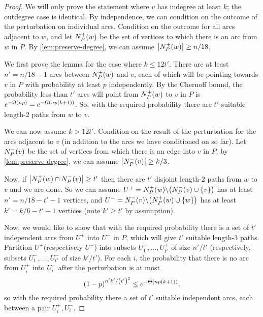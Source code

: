 \documentclass[11pt,english]{article}
\theoremstyle{plain}
\theoremstyle{definition}
\theoremstyle{definition}
\theoremstyle{plain}
\theoremstyle{plain}
\theoremstyle{plain}
\theoremstyle{plain}
\theoremstyle{remark}
\theoremstyle{remark}
\let\originalleft\left
\let\originalright\right
\renewcommand{\left}{\mathopen{}\mathclose\bgroup\originalleft}
\renewcommand{\right}{\aftergroup\egroup\originalright}
\begin{document}
\begin{proof}
We will only prove the statement where $v$ has indegree at least
$k$; the outdegree case is identical. By independence, we can condition
on the outcome of the perturbation on individual arcs. Condition on
the outcome for all arcs adjacent to $w$, and let $N_{P}^{+}\left(w\right)$
be the set of vertices to which there is an arc from $w$ in $P$.
By \ref{lem:preserve-degree}, we can assume $\left|N_{P}^{+}\left(w\right)\right|\ge n/18$.

We first prove the lemma for the case where $k\le12t'$. There are
at least $n'=n/18-1$ arcs between $N_{P}^{+}\left(w\right)$ and
$v$, each of which will be pointing towards $v$ in $P$ with
probability at least $p$ independently. By the Chernoff bound, the probability less
than $t'$ arcs will point from $N_{P}^{+}\left(w\right)$ to $v$
in $P$ is $e^{-\Omega\left(np\right)}=e^{-\Omega\left(np\left(k+1\right)\right)}$.
So, with the required probability there are $t'$ suitable length-2
paths from $w$ to $v$.

We can now assume $k>12t'$. Condition on the result of the perturbation
for the arcs adjacent to $v$ (in addition to the arcs we have conditioned
on so far). Let $N_{P}^{-}\left(v\right)$ be the set of vertices
from which there is an edge into $v$ in $P$; by \ref{lem:preserve-degree},
we can assume $\left|N_{P}^{-}\left(v\right)\right|\ge k/3$.

Now, if $\left|N_{P}^{+}\left(w\right)\cap N_{P}^{-}\left(v\right)\right|\ge t'$
then there are $t'$ disjoint length-2 paths from $w$ to $v$ and
we are done. So we can assume $U^{+}=N_{P}^{+}\left(w\right)\backslash\left(N_{P}^{-}\left(v\right)\cup\left\{ v\right\} \right)$
has at least $n'=n/18-t'-1$ vertices, and $U^{-}=N_{P}^{-}\left(v\right)\backslash\left(N_{P}^{+}\left(w\right)\cup\left\{ w\right\} \right)$
has at least $k'=k/6-t'-1$ vertices (note $k'\ge t'$ by assumption).

Now, we would like to show that with the required probability there
is a set of $t'$ independent arcs from $U^{+}$ into $U^{-}$ in
$P$, which will give $t'$ suitable length-3 paths. Partition $U^{+}$(respectively
$U^{-}$) into subsets $U_{1}^{+},\dots,U_{t'}^{+}$ of size $n'/t'$ (respectively, subsets
$U_{1}^{-},\dots,U_{t'}^{-}$ of size $k'/t'$). For each $i$,
the probability that there is no arc from $U_{i}^{+}$ into $U_{i}^{-}$
after the perturbation is at most
\[
\left(1-p\right)^{n'k'/\left(t'\right)^2}\le e^{-\Theta\left(np\left(k+1\right)\right)},
\]
so with the required probability there a set of $t'$ suitable independent
arcs, each between a pair $U_{i}^{+},U_{i}^{-}$.\end{proof}
\end{document}
